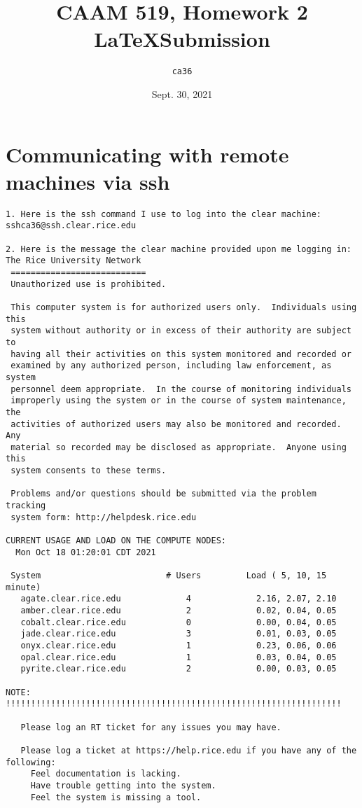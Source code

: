 \documentclass[11pt]{article}
\author{\texttt{ca36}}
\title{CAAM 519, Homework 2 \LaTeX Submission}
\date{Sept. 30, 2021}
\begin{document}
\maketitle

\section{Communicating with remote machines via ssh}

\begin{verbatim}
1. Here is the ssh command I use to log into the clear machine:
sshca36@ssh.clear.rice.edu

2. Here is the message the clear machine provided upon me logging in: 
The Rice University Network
 ===========================
 Unauthorized use is prohibited.

 This computer system is for authorized users only.  Individuals using this
 system without authority or in excess of their authority are subject to
 having all their activities on this system monitored and recorded or
 examined by any authorized person, including law enforcement, as system
 personnel deem appropriate.  In the course of monitoring individuals
 improperly using the system or in the course of system maintenance, the
 activities of authorized users may also be monitored and recorded.  Any
 material so recorded may be disclosed as appropriate.  Anyone using this
 system consents to these terms.

 Problems and/or questions should be submitted via the problem tracking
 system form: http://helpdesk.rice.edu

CURRENT USAGE AND LOAD ON THE COMPUTE NODES:
  Mon Oct 18 01:20:01 CDT 2021

 System                         # Users         Load ( 5, 10, 15 minute)
   agate.clear.rice.edu             4             2.16, 2.07, 2.10
   amber.clear.rice.edu             2             0.02, 0.04, 0.05
   cobalt.clear.rice.edu            0             0.00, 0.04, 0.05
   jade.clear.rice.edu              3             0.01, 0.03, 0.05
   onyx.clear.rice.edu              1             0.23, 0.06, 0.06
   opal.clear.rice.edu              1             0.03, 0.04, 0.05
   pyrite.clear.rice.edu            2             0.00, 0.03, 0.05

NOTE: !!!!!!!!!!!!!!!!!!!!!!!!!!!!!!!!!!!!!!!!!!!!!!!!!!!!!!!!!!!!!!!!!!!

   Please log an RT ticket for any issues you may have.

   Please log a ticket at https://help.rice.edu if you have any of the following:
     Feel documentation is lacking.
     Have trouble getting into the system.
     Feel the system is missing a tool.


\end{verbatim}
\end{document}
